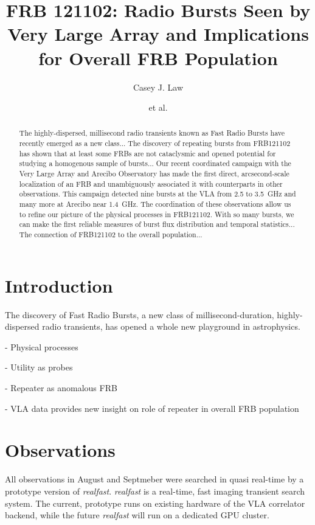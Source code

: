 \documentclass{emulateapj}
\begin{document}
\title{FRB 121102: Radio Bursts Seen by Very Large Array and Implications for Overall FRB Population}

\author{Casey J. Law}
\author{et al.}

\begin{abstract}
The highly-dispersed, millisecond radio transients known as Fast Radio Bursts have recently emerged as a new class...
The discovery of repeating bursts from FRB121102 has shown that at least some FRBs are not cataclysmic and opened potential for studying a homogenous sample of bursts...
Our recent coordinated campaign with the Very Large Array and Arecibo Observatory has made the first direct, arcsecond-scale localization of an FRB and unambiguously associated it with counterparts in other observations. This campaign detected nine bursts at the VLA from 2.5 to 3.5~GHz and many more at Arecibo near 1.4~GHz. The coordination of these observations allow us to refine our picture of the physical processes in FRB121102. 
With so many bursts, we can make the first reliable measures of burst flux distribution and temporal statistics...
The connection of FRB121102 to the overall population...

\end{abstract}

\section{Introduction}

The discovery of Fast Radio Bursts, a new class of millisecond-duration, highly-dispersed radio transients, has opened a whole new playground in astrophysics. 

- Physical processes

- Utility as probes

- Repeater as anomalous FRB

- VLA data provides new insight on role of repeater in overall FRB population

\section{Observations}

All observations in August and Septmeber were searched in quasi real-time by a prototype version of \emph{realfast}. \emph{realfast} is a real-time, fast imaging transient search system. The current, prototype runs on existing hardware of the VLA correlator backend, while the future \emph{realfast} will run on a dedicated GPU cluster.
\end{document}
